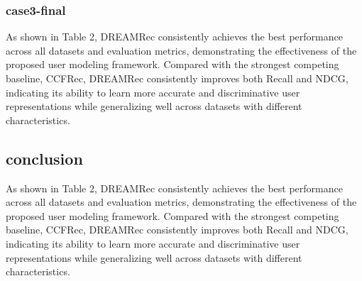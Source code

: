 \documentclass[letterpaper]{article} %
\theoremstyle{definition} %
\begin{document}
\subsubsection{case3-final}
As shown in Table 2, DREAMRec consistently achieves the best performance across all datasets and evaluation metrics, demonstrating the effectiveness of the proposed user modeling framework. Compared with the strongest competing baseline, CCFRec, DREAMRec consistently improves both Recall and NDCG, indicating its ability to learn more accurate and discriminative user representations while generalizing well across datasets with different characteristics.

\subsection{conclusion}
As shown in Table 2, DREAMRec consistently achieves the best performance across all datasets and evaluation metrics, demonstrating the effectiveness of the proposed user modeling framework. Compared with the strongest competing baseline, CCFRec, DREAMRec consistently improves both Recall and NDCG, indicating its ability to learn more accurate and discriminative user representations while generalizing well across datasets with different characteristics.



% 
\end{document}
